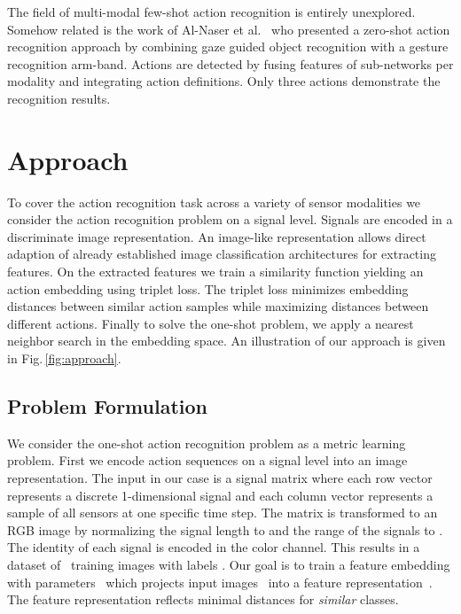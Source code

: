 \documentclass[10pt,conference,a4paper]{IEEEtran}
\def\andothers{et al.\ }
\def\figname{Fig.\,}
\begin{document}
The field of multi-modal few-shot action recognition is entirely unexplored. Somehow related is the work of Al-Naser \andothers \cite{al2018hierarchical} who presented a zero-shot action recognition approach by combining gaze guided object recognition with a gesture recognition arm-band. Actions are detected by fusing features of sub-networks per modality and integrating action definitions. Only three actions demonstrate the recognition results. 
\section{Approach}
To cover the action recognition task across a variety of sensor modalities we consider the action recognition problem on a signal level. Signals are encoded in a discriminate image representation. An image-like representation allows direct adaption of already established image classification architectures for extracting features. On the extracted features we train a similarity function yielding an action embedding using triplet loss. The triplet loss minimizes embedding distances between similar action samples while maximizing distances between different actions. Finally to solve the one-shot problem, we apply a nearest neighbor search in the embedding space. An illustration of our approach is given in \figname \ref{fig:approach}.

\subsection{Problem Formulation}

We consider the one-shot action recognition problem as a metric learning problem. First we encode action sequences on a signal level into an image representation.
The input in our case is a signal matrix  where each row vector represents a discrete 1-dimensional signal and each column vector represents a sample of all sensors at one specific time step. The matrix is transformed to an RGB image  by normalizing the signal length  to  and the range of the signals to . The identity of each signal is encoded in the color channel.
This results in a dataset  of~ training images  with labels .
Our goal is to train a feature embedding  with parameters~ which projects input images~ into a feature representation~. The feature representation reflects minimal distances for \textit{similar} classes.
\end{document}
